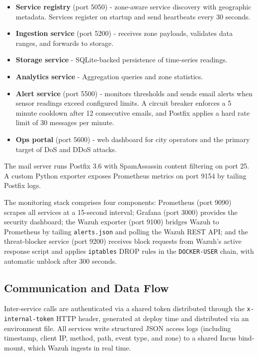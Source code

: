 \begin{itemize}[leftmargin=*]
  \item \textbf{Service registry} (port 5050) - zone-aware service discovery with
        geographic metadata. Services register on startup and send heartbeats every 30 seconds.
  \item \textbf{Ingestion service} (port 5200) - receives zone payloads, validates
        data ranges, and forwards to storage.
  \item \textbf{Storage service} - SQLite-backed persistence of time-series readings.
  \item \textbf{Analytics service} - Aggregation queries and zone statistics.
  \item \textbf{Alert service} (port 5500) - monitors thresholds and sends email
        alerts when sensor readings exceed configured limits. A circuit breaker enforces
        a 5 minute cooldown after 12 consecutive emails, and Postfix applies a hard
        rate limit of 30 messages per minute.
  \item \textbf{Ops portal} (port 5600) - web dashboard for city operators and the
        primary target of DoS and DDoS attacks.
\end{itemize}

The mail server runs Postfix 3.6 with SpamAssassin content filtering on port 25.
A custom Python exporter exposes Prometheus metrics on port 9154 by tailing
Postfix logs.

The monitoring stack comprises four components: Prometheus (port 9090) scrapes all
services at a 15-second interval; Grafana (port 3000) provides the security
dashboard; the Wazuh exporter (port 9100) bridges Wazuh to Prometheus by tailing
\texttt{alerts.json} and polling the Wazuh REST API; and the threat-blocker service
(port 9200) receives block requests from Wazuh's active response script and applies
\texttt{iptables} DROP rules in the \texttt{DOCKER-USER} chain, with automatic
unblock after 300 seconds.

\subsection{Communication and Data Flow}

Inter-service calls are authenticated via a shared token distributed through the
\texttt{x-internal-token} HTTP header, generated at deploy time and distributed via
an environment file. All services write structured JSON access logs (including
timestamp, client IP, method, path, event type, and zone) to a shared Incus
bind-mount, which Wazuh ingests in real time.

